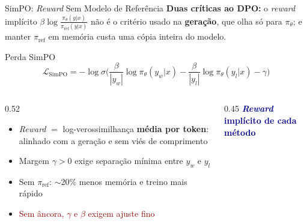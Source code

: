 \documentclass[aspectratio=169, xcolor=dvipsnames]{beamer}
\begin{document}
  \begin{frame}{SimPO: \textit{Reward} Sem Modelo de Referência \cite{meng2024simpo}}
    \textbf{Duas críticas ao DPO:} o \textit{reward} implícito $\beta\log\frac{\pi_\theta(y|x)}{\pi_{\text{ref}}(y|x)}$ não é o critério usado na \textbf{geração}, que olha só para $\pi_\theta$; e manter $\pi_{\text{ref}}$ em memória custa uma cópia inteira do modelo.
    \begin{block}{Perda SimPO}
      \vspace{-0.4em}
      \[
        \mathcal{L}_{\text{SimPO}} = -\log\sigma\!\bigg(
          \frac{\beta}{|y_w|}\log\pi_\theta(y_w|x)
          - \frac{\beta}{|y_l|}\log\pi_\theta(y_l|x) - \gamma \bigg)
      \]
    \end{block}
    \begin{columns}[T]
      \begin{column}{0.52\textwidth}
        \begin{itemize}\small
          \item \textit{Reward} $=$ log-verossimilhança \textbf{média por token}: alinhado com a geração e sem viés de comprimento
          \item Margem $\gamma > 0$ exige separação mínima entre $y_w$ e $y_l$
          \item Sem $\pi_{\text{ref}}$: $\sim$20\% menos memória e treino mais rápido
          \item \textcolor{DarkRed}{Sem âncora, $\gamma$ e $\beta$ exigem ajuste fino}
        \end{itemize}
      \end{column}
      \begin{column}{0.45\textwidth}
        \textcolor{DarkBlue}{\textbf{\textit{Reward} implícito de cada método}}


\end{column}
\end{columns}
\end{frame}
\end{document}
